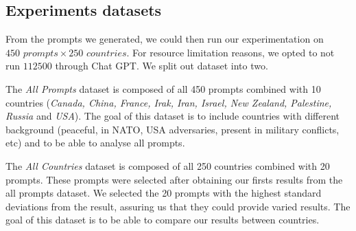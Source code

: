 \subsection{Experiments datasets}

From the prompts we generated, we could then run our experimentation on $450\textit{ prompts}\times 250\textit{ countries}$. For resource limitation reasons, we opted to not run $112 500$ through Chat GPT. We split out dataset into two.

The \textit{All Prompts}\label{dataset:all-prompts} dataset is composed of all 450 prompts combined with 10 countries (\textit{Canada, China, France, Irak, Iran, Israel, New Zealand, Palestine, Russia} and \textit{USA}). The goal of this dataset is to include countries with different background (peaceful, in NATO, USA adversaries, present in military conflicts, etc) and to be able to analyse all prompts.

The \textit{All Countries}\label{dataset:all-countries} dataset is composed of all 250 countries combined with 20 prompts. These prompts were selected after obtaining our firsts results from the all prompts dataset. We selected the 20 prompts with the highest standard deviations from the result, assuring us that they could provide varied results. The goal of this dataset is to be able to compare our results between countries.